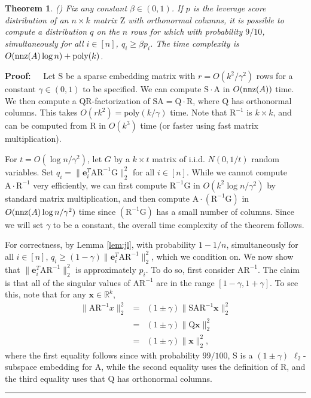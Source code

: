 \documentclass[11pt]{article}
\newtheorem{theorem}{Theorem}
\newenvironment{proof}{\begin{trivlist} \item {\bf Proof:~~}}
  {\qed\end{trivlist}}
\newcommand{\mat}[1]{{\ensuremath{\bm{\mathrm{#1}}}}}
\def\e{{\mathbf e}}
\def\matA{\mat{A}}
\def\matG{\mat{G}}
\def\matQ{\mat{Q}}
\def\matR{\mat{R}}
\def\matS{\mat{S}}
\def\matZ{\mat{Z}}
\def\nnz{{ \rm nnz }}
\def\qed{\hfill\rule{2mm}{2mm}}
\def\x{{\mathbf x}}
\newcommand{\poly}{{\mathrm{poly}}}
\begin{document}
\begin{theorem}\label{thm:fastLS}(\cite{CW13})
Fix any constant $\beta \in (0,1)$. 
If $p$ is the leverage score distribution of an $n \times k$ matrix $\matZ$ with orthonormal columns, it is possible to compute
a distribution $q$ on the $n$ rows for which with probability $9/10$, simultaneously 
for all $i \in [n]$, $q_i \geq \beta p_i$. The time complexity is $O(\nnz(A)\log n) + \poly(k)$. 
\end{theorem}
\begin{proof}
Let $\matS$ be a sparse embedding matrix with $r = O(k^2/\gamma^2)$ rows for a constant $\gamma \in (0,1)$ to be specified.  
We can compute $\matS \cdot \matA$ in $O(\nnz(A))$ time. We then compute a QR-factorization of $\matS \matA = \matQ \cdot \matR$, where
$\matQ$ has orthonormal columns. This takes $O(rk^2) = \poly(k/\gamma)$ time. Note that $\matR^{-1}$ is $k \times k$, and can be computed
from $\matR$ in $O(k^3)$ time (or faster using fast matrix multiplication). 

For $t = O(\log n / \gamma^2)$, 
let $G$ by a $k \times t$ matrix of i.i.d. $N(0,1/t)$ random variables. Set $q_i = \|\e_i^T\matA \matR^{-1}\matG\|_2^2$ for all $i \in [n]$.
While we cannot compute $\matA \cdot \matR^{-1}$ very efficiently, we can first compute $\matR^{-1} \matG$ in $O(k^2 \log n / \gamma^2)$
by standard matrix multiplication, and then compute $\matA \cdot (\matR^{-1} \matG)$ in $O(\nnz(A) \log n / \gamma^2)$ time since
$(\matR^{-1} \mat G)$ has a small number of columns. 
Since we will set $\gamma$ to be a constant, the overall time complexity of the theorem follows. 

For correctness, by Lemma \ref{lem:jl}, 
with probability $1-1/n$, simultaneously for all $i \in [n]$, $q_i \geq (1-\gamma) \|\e_i^T \matA \matR^{-1}\|_2^2$, which we condition on.
We now show that $\|\e_i^T \matA \matR^{-1}\|_2^2$ is approximately $p_i$. To do so, first consider $\matA\matR^{-1}$. The claim is that
all of the singular values of $\matA\matR^{-1}$ are in the range $[1-\gamma, 1+\gamma]$. To see this, note that for any $\x \in \mathbb{R}^k$,
\begin{eqnarray*}
\|\matA\matR^{-1}x\|_2^2 & = & (1 \pm \gamma) \|\matS \matA \matR^{-1}\x\|_2^2\\
& = & (1\pm \gamma)\|\matQ \x\|_2^2\\
& = & (1\pm \gamma)\|\x\|_2^2,
\end{eqnarray*}
where the first equality follows since with probability $99/100$, $\matS$ is a $(1 \pm \gamma)$ $\ell_2$-subspace embedding for $\matA$,
while the second equality uses the definition of $\matR$, and the third equality uses that $\matQ$ has orthonormal columns. 


\end{proof}
\end{document}
